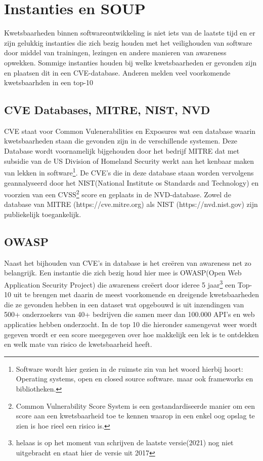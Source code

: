 \section{Instanties en SOUP}\label{sec:instanties-en-soup}
Kwetsbaarheden binnen softwareontwikkeling is niet iets van de laatste tijd en er zijn gelukkig instanties die zich bezig houden met het veilighouden van software door middel van trainingen, lezingen en andere manieren van awareness opwekken.
Sommige instanties houden bij welke kwetsbaarheden er gevonden zijn en plaatsen dit in een CVE-database.
Anderen melden veel voorkomende kwetsbaarhden in een top-10

\subsection{CVE Databases, MITRE, NIST, NVD}\label{subsec:mitre-nist-nvd}
CVE staat voor Common Vulenerabilities en Exposures wat een database waarin kwetsbaarheden staan die gevonden zijn in de verschillende systemen.
Deze Database wordt voornamelijk bijgehouden door het bedrijf MITRE dat met subsidie van de US Division of Homeland Security werkt aan het kenbaar maken van lekken in software\footnote{Software wordt hier gezien in de ruimste zin van het woord hierbij hoort: Operating systems, open en closed source software. maar ook frameworks en bibliotheken.}.
De CVE's die in deze database staan worden vervolgens geannalyseerd door het NIST(National Institute os Standards and Technology) en voorzien van een CVSS\footnote{Common Vulnerability Score System is een gestandardiseerde manier om een score aan een kwetsbaarheid toe te kennen waarop in een enkel oog opslag te zien is hoe rieel een risico is.} score en geplaats in de NVD-database.
Zowel de database van MITRE (https://cve.mitre.org) als NIST (https://nvd.nist.gov) zijn publiekelijk toegankelijk.

\subsection{OWASP}\label{subsec:owasp}
Naast het bijhouden van CVE's in database is het creëren van awareness net zo belangrijk.
Een instantie die zich bezig houd hier mee is OWASP(Open Web Application Security Project) die awareness creëert door ideree 5 jaar\footnote{helaas is op het moment van schrijven de laatste versie(2021) nog niet uitgebracht en staat hier de versie uit 2017} een Top-10 uit te brengen met daarin de meest voorkomende en dreigende kwetsbaarheden die ze gevonden hebben in een dataset wat opgebouwd is uit inzendingen van 500+ onderzoekers van 40+ bedrijven die samen meer dan 100.000 API's en web applicaties hebben onderzocht.
In de top 10 die hieronder samengevat weer wordt gegeven wordt er een score meegegeven over hoe makkelijk een lek is te ontdekken en welk mate van risico de kwetsbaarheid heeft.

